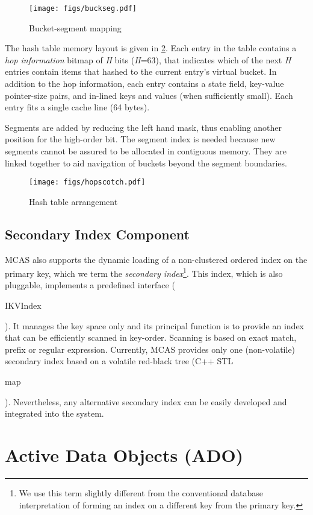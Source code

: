 \documentclass[letterpaper,twocolumn,10pt]{article}
\newcommand{\code}[1]{\begin{ttcodefont}#1\end{ttcodefont}}
\begin{document}
\begin{figure}
\centering
\texttt{[image: figs/buckseg.pdf]}
\caption{Bucket-segment mapping}
\label{fig:buckseg}
\end{figure}

The hash table memory layout is given in \ref{fig:hopscotch}.  Each
entry in the table contains a \textit{hop information} bitmap of \textit{H}
bits (\textit{H}=63), that indicates which of the next \textit{H} entries contain
items that hashed to the current entry's virtual bucket.  In addition
to the hop information, each entry contains a state field, key-value
pointer-size pairs, and in-lined keys and values (when sufficiently
small).  Each entry fits a single cache line (64 bytes).

Segments are added by reducing the left hand mask, thus enabling
another position for the high-order bit.  The segment index is needed
because new segments cannot be assured to be allocated in contiguous
memory.  They are linked together to aid navigation of buckets beyond
the segment boundaries.

\begin{figure}[ht]
\centering
\texttt{[image: figs/hopscotch.pdf]}
\caption{Hash table arrangement}
\label{fig:hopscotch}
\end{figure}


\subsection{Secondary Index Component}

MCAS also supports the dynamic loading of a non-clustered ordered
index on the primary key, which we term the \textit{secondary
  index}\footnote{We use this term slightly different from the
  conventional database interpretation of forming an index on a
  different key from the primary key.}. This index, which is also
pluggable, implements a predefined interface (\code{IKVIndex}).  It
manages the key space only and its principal function is to provide an
index that can be efficiently scanned in key-order.  Scanning is based
on exact match, prefix or regular expression.  Currently, MCAS
provides only one (non-volatile) secondary index based on a volatile
red-black tree (C++ STL \code{map}).  Nevertheless, any alternative
secondary index can be easily developed and integrated into the
system.


\section{Active Data Objects (ADO)}
\label{sec:ado}
\end{document}
